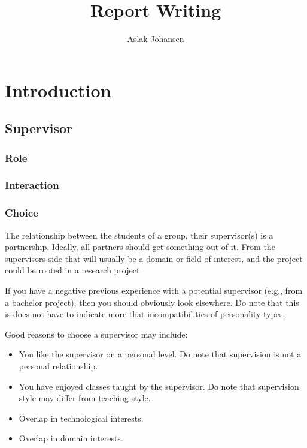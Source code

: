 \documentclass[a4paper]{memoir}
\title{Report Writing \\ \scalebox{0.85}{for Software BSc and MSc Projects}}
\author{Aslak Johansen}
\begin{document}
\maketitle

\setcounter{tocdepth}{2}
\tableofcontents

\chapter{Introduction}


\section{Supervisor}

\subsection{Role}

\subsection{Interaction}

\subsection{Choice}

The relationship between the students of a group, their supervisor(s) is a partnership. Ideally, all partners should get something out of it. From the supervisors side that will usually be a domain or field of interest, and the project could be rooted in a research project.

If you have a negative previous experience with a potential supervisor (e.g., from a bachelor project), then you should obviously look elsewhere. Do note that this is does not have to indicate more that incompatibilities of personality types.

Good reasons to choose a supervisor may include:
\begin{itemize}
  \item You like the supervisor on a personal level. Do note that supervision is not a personal relationship.
  \item You have enjoyed classes taught by the supervisor. Do note that supervision style may differ from teaching style.
  \item Overlap in technological interests.
  \item Overlap in domain interests.
\end{itemize}
\end{document}
